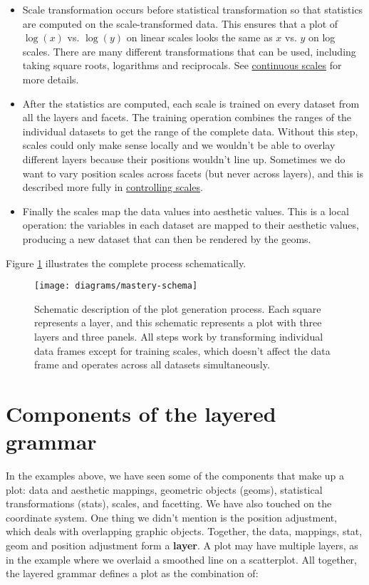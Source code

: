\begin{itemize}
\item
  Scale transformation occurs before statistical transformation so that
  statistics are computed on the scale-transformed data. This ensures
  that a plot of \(\log(x)\) vs. \(\log(y)\) on linear scales looks the
  same as \(x\) vs. \(y\) on log scales. There are many different
  transformations that can be used, including taking square roots,
  logarithms and reciprocals. See
  \protect\hyperlink{sub:scale-position}{continuous scales} for more
  details.
\item
  After the statistics are computed, each scale is trained on every
  dataset from all the layers and facets. The training operation
  combines the ranges of the individual datasets to get the range of the
  complete data. Without this step, scales could only make sense locally
  and we wouldn't be able to overlay different layers because their
  positions wouldn't line up. Sometimes we do want to vary position
  scales across facets (but never across layers), and this is described
  more fully in \protect\hyperlink{sub:controlling-scales}{controlling
  scales}.
\item
  Finally the scales map the data values into aesthetic values. This is
  a local operation: the variables in each dataset are mapped to their
  aesthetic values, producing a new dataset that can then be rendered by
  the geoms.
\end{itemize}

Figure \ref{fig:schematic} illustrates the complete process
schematically.

\begin{figure}[htbp]
  \centering
  \texttt{[image: diagrams/mastery-schema]}
  \caption{Schematic description of the plot generation process. Each square represents a layer, and this schematic represents a plot with three layers and three panels. All steps work by transforming individual data frames except for training scales, which doesn't affect the data frame and operates across all datasets simultaneously.}
  \label{fig:schematic}
\end{figure}

\hypertarget{sec:components}{%
\section{Components of the layered grammar}\label{sec:components}}

In the examples above, we have seen some of the components that make up
a plot: data and aesthetic mappings, geometric objects (geoms),
statistical transformations (stats), scales, and facetting. We have also
touched on the coordinate system. One thing we didn't mention is the
position adjustment, which deals with overlapping graphic objects.
Together, the data, mappings, stat, geom and position adjustment form a
\textbf{layer}. A plot may have multiple layers, as in the example where
we overlaid a smoothed line on a scatterplot. All together, the layered
grammar defines a plot as the combination of: 

